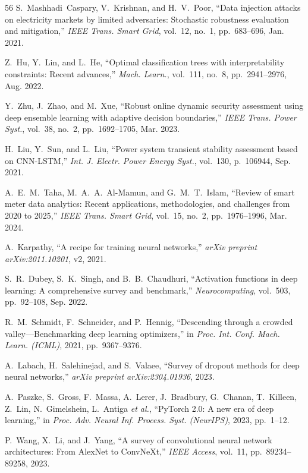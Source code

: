 \documentclass[journal]{IEEEtran}
\begin{document}
\begin{thebibliography}{56}
 S.~Mashhadi~Caspary, V.~Krishnan, and H.~V.~Poor, ``Data injection attacks on electricity markets by limited adversaries: Stochastic robustness evaluation and mitigation,'' \textit{IEEE Trans. Smart Grid}, vol.~12, no.~1, pp.~683--696, Jan. 2021.

 Z.~Hu, Y.~Lin, and L.~He, ``Optimal classification trees with interpretability constraints: Recent advances,'' \textit{Mach. Learn.}, vol.~111, no.~8, pp.~2941--2976, Aug. 2022.

 Y.~Zhu, J.~Zhao, and M.~Xue, ``Robust online dynamic security assessment using deep ensemble learning with adaptive decision boundaries,'' \textit{IEEE Trans. Power Syst.}, vol.~38, no.~2, pp.~1692--1705, Mar. 2023.

 H.~Liu, Y.~Sun, and L.~Liu, ``Power system transient stability assessment based on CNN-LSTM,'' \textit{Int. J. Electr. Power Energy Syst.}, vol.~130, p.~106944, Sep. 2021.

 A.~E.~M.~Taha, M.~A.~A.~Al-Mamun, and G.~M.~T.~Islam, ``Review of smart meter data analytics: Recent applications, methodologies, and challenges from 2020 to 2025,'' \textit{IEEE Trans. Smart Grid}, vol.~15, no.~2, pp.~1976--1996, Mar. 2024.

 A.~Karpathy, ``A recipe for training neural networks,'' \textit{arXiv preprint arXiv:2011.10201}, v2, 2021.

 S.~R.~Dubey, S.~K.~Singh, and B.~B.~Chaudhuri, ``Activation functions in deep learning: A comprehensive survey and benchmark,'' \textit{Neurocomputing}, vol.~503, pp.~92--108, Sep. 2022.

 R.~M.~Schmidt, F.~Schneider, and P.~Hennig, ``Descending through a crowded valley---Benchmarking deep learning optimizers,'' in \textit{Proc. Int. Conf. Mach. Learn. (ICML)}, 2021, pp.~9367--9376.

 A.~Labach, H.~Salehinejad, and S.~Valaee, ``Survey of dropout methods for deep neural networks,'' \textit{arXiv preprint arXiv:2304.01936}, 2023.

 A.~Paszke, S.~Gross, F.~Massa, A.~Lerer, J.~Bradbury, G.~Chanan, T.~Killeen, Z.~Lin, N.~Gimelshein, L.~Antiga \emph{et al.}, ``PyTorch 2.0: A new era of deep learning,'' in \textit{Proc. Adv. Neural Inf. Process. Syst. (NeurIPS)}, 2023, pp.~1--12.

 P.~Wang, X.~Li, and J.~Yang, ``A survey of convolutional neural network architectures: From AlexNet to ConvNeXt,'' \textit{IEEE Access}, vol.~11, pp.~89234--89258, 2023.


\end{thebibliography}
\end{document}
